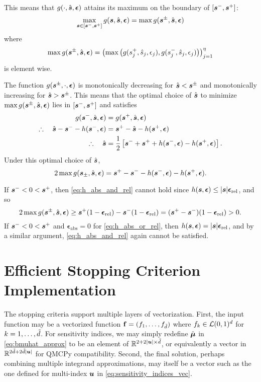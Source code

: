 \documentclass{article}
\newcommand{\bepsabs}{\boldsymbol{\epsilon}_\text{abs}}
\newcommand{\bepsrel}{\boldsymbol{\epsilon}_\text{rel}}
\begin{document}
This means that $g(\cdot,\hat{\boldsymbol{s}},\boldsymbol{\epsilon})$ attains its maximum on the boundary of $[\boldsymbol{s}^-,\boldsymbol{s}^+]$:
\begin{equation}
    \max_{\boldsymbol{s} \in [\boldsymbol{s}^-,\boldsymbol{s}^+]} g(\boldsymbol{s},\hat{\boldsymbol{s}},\boldsymbol{\epsilon}) = \max g(\boldsymbol{s}^\pm,\hat{\boldsymbol{s}},\boldsymbol{\epsilon})
\end{equation}
where
\begin{equation}
    \max g(\boldsymbol{s}^\pm,\hat{\boldsymbol{s}},\boldsymbol{\epsilon}) = \left(\max\left(g(s_j^+,\hat{s}_j,\epsilon_j),g(s_j^-,\hat{s}_j,\epsilon_j)\right)\right)_{j=1}^\eta
\end{equation}
is element wise. 

The function $g(\boldsymbol{s}^\pm,\cdot,\boldsymbol{\epsilon})$ is monotonically decreasing for $\hat{\boldsymbol{s}} < \boldsymbol{s}^\pm$ and monotonically increasing for $\hat{\boldsymbol{s}} > \boldsymbol{s}^\pm$. This means that the optimal choice of $\hat{\boldsymbol{s}}$ to minimize $\max g(\boldsymbol{s}^\pm,\hat{\boldsymbol{s}},\boldsymbol{\epsilon})$ lies in $[\boldsymbol{s}^-,\boldsymbol{s}^+]$ and satisfies
\begin{align}
    g(\boldsymbol{s}^-,\hat{\boldsymbol{s}},\boldsymbol{\epsilon}) &= g(\boldsymbol{s}^+,\hat{\boldsymbol{s}},\boldsymbol{\epsilon}) \\
    \therefore \quad \hat{\boldsymbol{s}} - \boldsymbol{s}^- - h(\boldsymbol{s}^-,\boldsymbol{\epsilon}) &= \boldsymbol{s}^+ - \hat{\boldsymbol{s}} - h(\boldsymbol{s}^+,\boldsymbol{\epsilon}) \\ 
    \therefore \quad \hat{\boldsymbol{s}} &= \frac{1}{2}\left[ \boldsymbol{s}^- + \boldsymbol{s}^+ +h(\boldsymbol{s}^-,\boldsymbol{\epsilon}) - h(\boldsymbol{s}^+,\boldsymbol{\epsilon}) \right].
\end{align}
Under this optimal choice of $\hat{\boldsymbol{s}}$, 
\begin{equation}
    \label{eq:optimal_shat}
    2 \max g(\boldsymbol{s}_\pm,\hat{\boldsymbol{s}},\boldsymbol{\epsilon}) =  \boldsymbol{s}^+  -  \boldsymbol{s}^-  - h(\boldsymbol{s}^-,\boldsymbol{\epsilon}) - h(\boldsymbol{s}^+,\boldsymbol{\epsilon}).
\end{equation}

If $\boldsymbol{s}^- < 0 < \boldsymbol{s}^+$, then \eqref{eq:h_abs_and_rel} cannot hold since $h(\bs,\bepsilon) \le \lvert \bs \rvert \bepsrel$, and so
\begin{equation}
2 \max g(\bs^\pm,\hat{\bs},\bepsilon) \ge \bs^+ (1 - \bepsrel) - \bs^- (1  - \bepsrel) = (\bs^+ - \bs^-)(1 - \bepsrel) > 0.
\end{equation}
If $\boldsymbol{s}^- < 0 < \boldsymbol{s}^+$ and $\bepsabs = 0$ for \eqref{eq:h_abs_or_rel}, then $h(\bs,\bepsilon) = \lvert \bs \rvert \bepsrel$, and by a similar argument, \eqref{eq:h_abs_and_rel} again cannot be satisfied.

\section{Efficient Stopping Criterion Implementation}

The stopping criteria support multiple layers of vectorization. First, the input function may be a vectorized function $\mathbf{f} = (f_1,\dots,f_{\tilde{d}} )$ where $f_k \in \mathcal{L}(0,1)^d$ for $k=1,\dots,\tilde{d}$. For sensitivity indices, we may simply redefine $\hat{\boldsymbol{\mu}}$ in \eqref{eq:bmuhat_approx} to be an element of $\mathbb{R}^{2+2\lvert \boldsymbol{u} \rvert \times \tilde{d}}$, or equivalently a vector in $\mathbb{R}^{2\tilde{d}+2\tilde{d}\lvert \boldsymbol{u} \rvert}$ for QMCPy compatibility. Second, the final solution, perhaps combining multiple integrand approximations, may itself be a vector such as the one defined for multi-index $\boldsymbol{u}$ in  \eqref{eq:sensitivity_indices_vec}.
\end{document}
